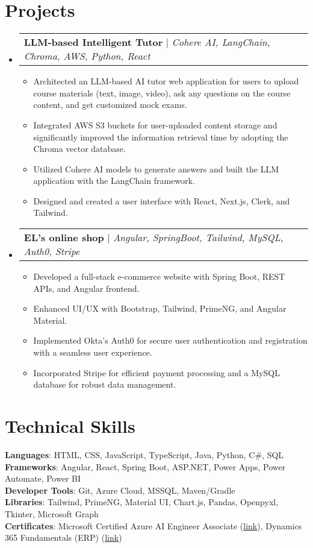 \documentclass[letterpaper,11pt]{article}
\makeatletter
\newcommand{\resumeItem}[1]{
  \item\small{
    {#1 \vspace{-2pt}}
  }
}
\newcommand{\resumeProjectHeading}[2]{
    \item
    \begin{tabular*}{0.97\textwidth}{l@{\extracolsep{\fill}}r}
      \small#1 & #2 \\
    \end{tabular*}\vspace{-7pt}
}
\newcommand{\resumeSubHeadingListStart}{\begin{itemize}[leftmargin=0.15in, label={}]}
\newcommand{\resumeSubHeadingListEnd}{\end{itemize}}
\newcommand{\resumeItemListStart}{\begin{itemize}}
\newcommand{\resumeItemListEnd}{\end{itemize}\vspace{-5pt}}
\makeatother
\begin{document}
\section{Projects}
   \resumeSubHeadingListStart
     \resumeProjectHeading
     {\textbf{LLM-based Intelligent Tutor} $|$ \emph{Cohere AI, LangChain, Chroma, AWS, Python, React}}{}
         \resumeItemListStart
           \resumeItem{Architected an LLM-based AI tutor web application for users to upload course materials (text, image, video), ask any questions on the course content, and get customized mock exams.}
            \resumeItem{Integrated AWS S3 buckets for user-uploaded content storage and significantly improved the information retrieval time by adopting the Chroma vector database.}
           \resumeItem{Utilized Cohere AI models to generate answers and built the LLM application with the LangChain framework.}
           \resumeItem{Designed and created a user interface with React, Next.js, Clerk, and Tailwind.}
           \resumeItemListEnd
    \resumeProjectHeading
    {\textbf{EL's online shop} $|$ \emph{Angular, SpringBoot, Tailwind, MySQL, Auth0, Stripe}}{}
         \resumeItemListStart
           \resumeItem{Developed a full-stack e-commerce website with Spring Boot, REST APIs, and Angular frontend.}
            \resumeItem{Enhanced UI/UX with Bootstrap, Tailwind, PrimeNG, and Angular Material.}
           \resumeItem{Implemented Okta’s Auth0 for secure user authentication and registration with a seamless user experience.}
           \resumeItem{Incorporated Stripe for efficient payment processing and a MySQL database for robust data management.}
         \resumeItemListEnd
   \resumeSubHeadingListEnd

\section{Technical Skills}
 \begin{itemize}[leftmargin=0.15in, label={}]
    \small{\item{
     \textbf{Languages}{: HTML, CSS, JavaScript, TypeScript, Java, Python, C\#, SQL} \\
     \textbf{Frameworks}{: Angular, React, Spring Boot, ASP.NET, Power Apps, Power Automate, Power BI} \\
     \textbf{Developer Tools}{: Git, Azure Cloud, MSSQL, Maven/Gradle} \\
     \textbf{Libraries}{: Tailwind, PrimeNG, Material UI, Chart.js, Pandas, Openpyxl, Tkinter, Microsoft Graph} \\
    \textbf{Certificates}{: Microsoft Certified Azure AI Engineer Associate (\href{https://learn.microsoft.com/en-us/users/zichengli-4388/credentials/8f80de9e7944a10}{link}), Dynamics 365 Fundamentals (ERP) (\href{https://learn.microsoft.com/en-us/users/zichengli-4388/credentials/5d28421aefedb4ec}{link})}
    }}
 \end{itemize}
\end{document}
